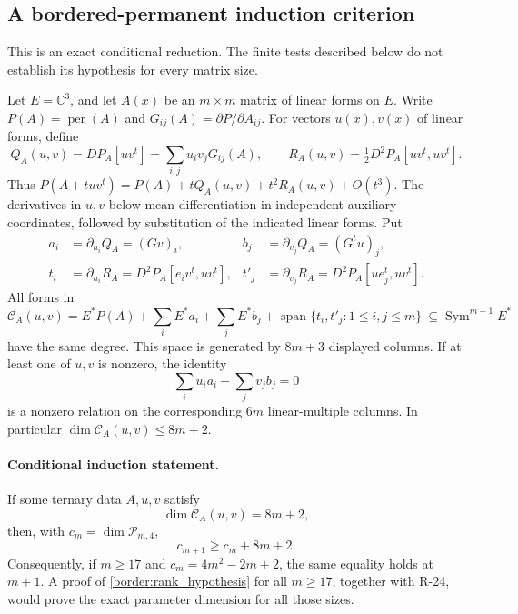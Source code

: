 \subsection{A bordered-permanent induction criterion}

This is an exact conditional reduction. The finite tests described
below do not establish its hypothesis for every matrix size.

Let $E=\mathbb C^3$, and let $A(x)$ be an $m\times m$ matrix of
linear forms on $E$. Write $P(A)=\operatorname{per}(A)$ and
$G_{ij}(A)=\partial P/\partial A_{ij}$. For vectors $u(x),v(x)$
of linear forms, define
\[
 Q_A(u,v)=DP_A[uv^t]
          =\sum_{i,j}u_iv_jG_{ij}(A),\qquad
 R_A(u,v)=\tfrac12D^2P_A[uv^t,uv^t].
\]
Thus $P(A+tuv^t)=P(A)+tQ_A(u,v)+t^2R_A(u,v)+O(t^3)$.
The derivatives in $u,v$ below mean differentiation in independent
auxiliary coordinates, followed by substitution of the indicated
linear forms. Put
\begin{align*}
 a_i&=\partial_{u_i}Q_A=(Gv)_i,&
 b_j&=\partial_{v_j}Q_A=(G^tu)_j,\\
 t_i&=\partial_{u_i}R_A
          =D^2P_A[e_iv^t,uv^t],&
 t'_j&=\partial_{v_j}R_A
          =D^2P_A[ue_j^t,uv^t].
\end{align*}
All forms in
\begin{equation}\label{border:C}
 \mathcal C_A(u,v)
 =E^*P(A)
   +\sum_i E^*a_i+\sum_j E^*b_j
   +\operatorname{span}\{t_i,t'_j:1\leq i,j\leq m\}
 \ \subseteq\operatorname{Sym}^{m+1}E^*
\end{equation}
have the same degree. This space is generated by $8m+3$ displayed
columns. If at least one of $u,v$ is nonzero, the identity
\begin{equation}\label{border:scaling_relation}
 \sum_i u_i a_i-\sum_jv_jb_j=0
\end{equation}
is a nonzero relation on the corresponding $6m$ linear-multiple
columns. In particular $\dim\mathcal C_A(u,v)\leq8m+2$.

\paragraph{Conditional induction statement.}
If some ternary data $A,u,v$ satisfy
\begin{equation}\label{border:rank_hypothesis}
 \dim\mathcal C_A(u,v)=8m+2,
\end{equation}
then, with $c_m=\dim\mathcal P_{m,4}$,
\begin{equation}\label{border:increment}
 c_{m+1}\geq c_m+8m+2.
\end{equation}
Consequently, if $m\geq17$ and $c_m=4m^2-2m+2$, the same
equality holds at $m+1$. A proof of
\eqref{border:rank_hypothesis} for all $m\geq17$, together with
R-24, would prove the exact parameter dimension for all those sizes.

